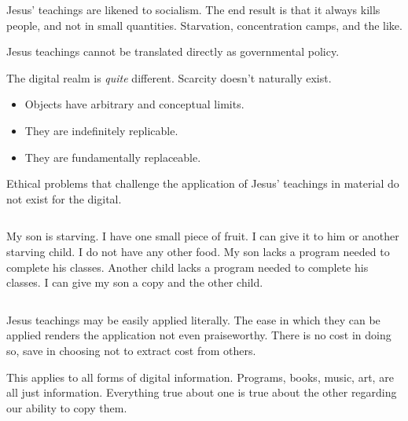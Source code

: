 \documentclass{beamer}
\begin{document}
\begin{frame}
  Jesus' teachings are likened to socialism.
  The end result is that it always kills people, and not in small quantities.
  Starvation, concentration camps, and the like.

  Jesus teachings cannot be translated directly as governmental policy.
\end{frame}

\begin{frame}
  The digital realm is \emph{quite} different. Scarcity doesn't naturally exist.\pause
  \begin{itemize}
	\item Objects have arbitrary and conceptual limits.\pause
	\item They are indefinitely replicable.\pause
	\item They are fundamentally replaceable.
  \end{itemize}
\end{frame}

\begin{frame}
  Ethical problems that challenge the application of Jesus' teachings in material do not exist for the digital.
  \begin{columns}
	  My son is starving.
	  I have one small piece of fruit.
	  I can give it to him or another starving child.
	  I do not have any other food.
	  My son lacks a program needed to complete his classes.
	  Another child lacks a program needed to complete his classes.
	  I can give my son a copy and the other child.
  \end{columns}
\end{frame}

\begin{frame}
  Jesus teachings may be easily applied literally.
  The ease in which they can be applied renders the application not even praiseworthy.
  There is no cost in doing so, save in choosing not to extract cost from others.
\end{frame}

\begin{frame}
  This applies to all forms of digital information.
  Programs, books, music, art, are all just information.
  Everything true about one is true about the other regarding our ability to copy them.
\end{frame}
\end{document}
